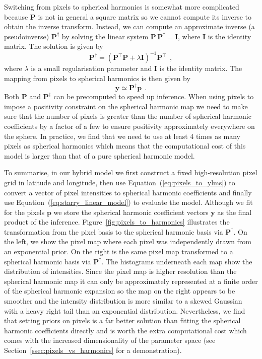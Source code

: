 \documentclass[12pt,dvipsnames]{report}
\newcommand{\hquad}{~~}
\begin{document}
Switching from pixels to spherical harmonics is somewhat more complicated because $\mathbf{P}$ is not in general a square matrix so we cannot compute its inverse to obtain the inverse transform.
Instead, we can compute an approximate inverse (a pseudoinverse) $\mathbf{P}^\dagger$ by solving the linear system $\mathbf{P}\,\mathbf{P}^\dagger=\mathbf{I}$, where $\mathbf{I}$ is the identity matrix. 
The solution is given by
\begin{equation}
\mathbf{P}^\dagger=\left(\mathbf{P}^{\top} \mathbf{P}+\lambda \mathbf{I}\right)^{-1} \mathbf{P}^{\top}
    \hquad,
\end{equation}
where $\lambda$ is a small regularisation parameter and $\mathbf{I}$ is the identity matrix.
The mapping from pixels to spherical harmonics is then given by
\begin{equation}
    \mathbf{y}\simeq\mathbf{P}^\dagger\mathbf{p}
    \hquad.
    \label{eq:pixels_to_ylms}
\end{equation}
Both $\mathbf{P}$ and $\mathbf{P}^\dagger$ can be precomputed to speed up inference.
When using pixels to impose a positivity constraint on the spherical harmonic map we 
need to make sure that the number of pixels is greater than the number of spherical 
harmonic coefficients by a factor of a few to ensure positivity approximately everywhere 
on the sphere.
In practice, we find that we need to use at least 4 times as many pixels as spherical 
harmonics which means that the computational cost of this model is larger than that of a 
pure spherical harmonic model. 

To summarise, in our hybrid model we first construct a fixed high-resolution pixel grid in latitude and longitude, then use Equation~(\ref{eq:pixels_to_ylms}) to convert a vector of pixel intensities to spherical harmonic coefficients and finally use Equation~(\ref{eq:starry_linear_model}) to evaluate the model.
Although we fit for the pixels $\mathbf{p}$ we store the spherical harmonic coefficient vectors $\mathbf{y}$ as the final product of the inference. 
Figure~\ref{fig:pixels_to_harmonics} illustrates the transformation from the pixel basis to the spherical harmonic basis via $\mathbf{P}^\dagger$.
On the left, we show the pixel map where each pixel was independently drawn from an exponential prior. 
On the right is the same pixel map transformed to a spherical harmonic basis via $\mathbf{P}^\dagger$. 
The histograms underneath each map show the distribution of intensities.
Since the pixel map is higher resolution than the spherical harmonic map it can only be approximately represented at a finite order of the spherical harmonic expansion so the map on the right appears to be smoother and the intensity distribution is more similar to a skewed Gaussian with a heavy right tail than an exponential distribution.
Nevertheless, we find that setting priors on pixels is a far better solution than fitting the spherical harmonic coefficients directly and is worth the extra computational cost which comes with the increased dimensionality of the parameter space (see Section~\ref{ssec:pixels_vs_harmonics} for a demonstration).
\end{document}
